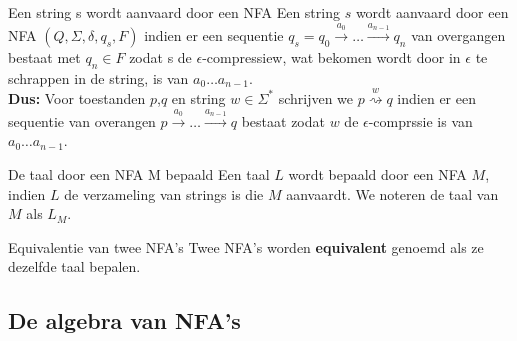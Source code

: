 \newpage

\begin{theo}{Een string s wordt aanvaard door een NFA}
    Een string $s$ wordt aanvaard door een NFA $(Q,\Sigma, \delta, q_s, F)$ indien
    er een sequentie $q_s = q_0 \overset{a_0}{\to} \ldots \overset{a_{n-1}}{\to} q_n$
    van overgangen bestaat met $q_n \in F$ zodat s de $\epsilon$-compressiew, wat bekomen wordt door
    in $\epsilon$ te schrappen in de string, is van $a_0 \ldots a_{n-1}$. \\
    
    \noindent \textbf{Dus:} Voor toestanden $p$,$q$ en string $w \in \Sigma^*$ schrijven we $p \overset{w}{\rightsquigarrow} q$
    indien er een sequentie van overangen $ p \overset{a_0}{\to} \ldots \overset{a_{n-1}}{\to} q$ bestaat zodat $w$
    de $\epsilon$-comprssie is van $a_0 \ldots a_{n-1}$.
\end{theo}

\begin{theo}{De taal door een NFA M bepaald}
    Een taal $L$ wordt bepaald door een NFA $M$, indien $L$ de verzameling van strings is die $M$ aanvaardt.
    We noteren de taal van $M$ als $L_M$.
\end{theo}

\begin{theo}{Equivalentie van twee NFA's}
    Twee NFA's worden \textbf{equivalent} genoemd als ze dezelfde taal bepalen.
\end{theo}

\subsection{De algebra van NFA's}

\vspace{0.5cm}

